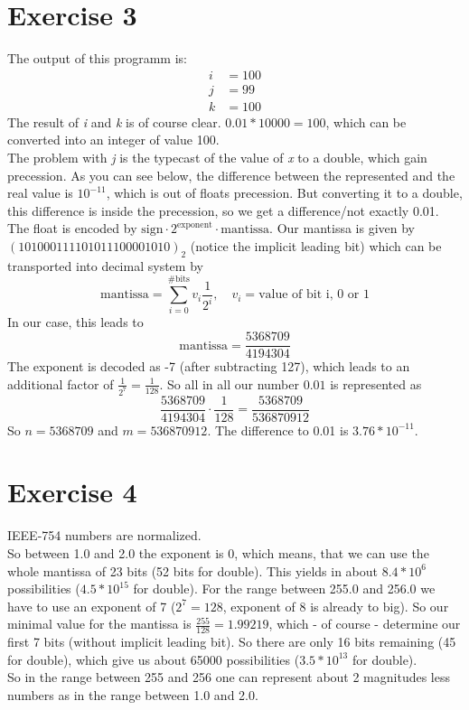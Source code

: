 \documentclass{scrartcl}
\begin{document}
	\section*{Exercise 3}
	The output of this programm is:
	\begin{align*}
		i &= 100\\
		j &= 99\\
		k &= 100
	\end{align*}
	The result of \emph{i} and \emph{k} is of course clear. $0.01 * 10000 = 100$, which can be converted into an integer of value 100.\\
	The problem with \emph{j} is the typecast of the value of \emph{x} to a double, which gain precession.
	As you can see below, the difference between the represented and the real value is $10^{-11}$, which is out of floats precession. But converting it to a double, this difference is inside the precession, so we get a difference/not exactly 0.01.
	\\
	The float is encoded by $\text{sign} \cdot 2^\text{exponent} \cdot \text{mantissa}$. Our mantissa is given by $(101000111101011100001010)_2$ (notice the implicit leading bit) which can be transported into decimal system by
	\begin{equation}
		\text{mantissa} = \sum_{i = 0}^{\text{\# bits}} v_i \frac{1}{2^i}, \quad v_i = \text{value of bit i, 0 or 1}
	\end{equation}
	In our case, this leads to
	\begin{equation}
		\text{mantissa} = \frac{5368709}{4194304}
	\end{equation}
	The exponent is decoded as -7 (after subtracting 127), which leads to an additional factor of $\frac{1}{2^7} = \frac{1}{128}$. So all in all our number $0.01$ is represented as
	\begin{equation}
		\frac{5368709}{4194304} \cdot  \frac{1}{128} = \frac{5368709}{536870912}
	\end{equation}
	So $n = 5368709$ and $m = 536870912$. The difference to 0.01 is $3.76 * 10^{-11}$.
	
	\section*{Exercise 4}
	IEEE-754 numbers are normalized.\\
	So between 1.0 and 2.0 the exponent is 0, which means, that we can use the whole mantissa of 23 bits (52 bits for double). This yields in about $8.4 * 10^6$ possibilities ($4.5 * 10^{15}$ for double).
	For the range between 255.0 and 256.0 we have to use an exponent of 7 ($2^7 = 128$, exponent of 8 is already to big). So our minimal value for the mantissa is $\frac{255}{128} = 1.99219$, which - of course - determine our first 7 bits (without implicit leading bit). So there are only 16 bits remaining (45 for double), which give us about 65000 possibilities ($3.5 * 10^{13}$ for double).\\
	So in the range between 255 and 256 one can represent about 2 magnitudes less numbers as in the range between 1.0 and 2.0.
	
\end{document}
